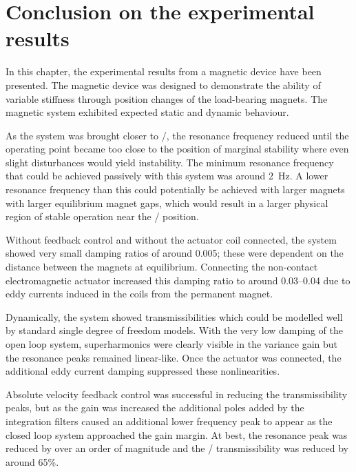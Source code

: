\documentclass[11pt,a4paper]{memoir}
\begin{document}
\section{Conclusion on the experimental results}

In this chapter, the experimental results from a magnetic device have been presented.
The magnetic device was designed to demonstrate the ability of variable stiffness through position changes of the load-bearing magnets.
The magnetic system exhibited expected static and dynamic behaviour.

As the system was brought closer to \qzs/, the resonance frequency reduced until the operating point became too close to the position of marginal stability where even slight disturbances would yield instability.
The minimum resonance frequency that could be achieved passively with this system was around \SI{2}{Hz}.
A lower resonance frequency than this could potentially be achieved with larger magnets with larger equilibrium magnet gaps, which would result in a larger physical region of stable operation near the \qzs/ position.

Without feedback control and without the actuator coil connected, the system showed very small damping ratios of around \num{0.005}; these were dependent on the distance between the magnets at equilibrium.
Connecting the non-contact electromagnetic actuator increased this damping ratio to around \num{0.03}--\num{0.04} due to eddy currents induced in the coils from the permanent magnet.

Dynamically, the system showed transmissibilities which could be modelled well by standard single degree of freedom models.
With the very low damping of the open loop system, superharmonics were clearly visible in the variance gain but the resonance peaks remained linear-like.
Once the actuator was connected, the additional eddy current damping suppressed these nonlinearities.

Absolute velocity feedback control was successful in reducing the transmissibility peaks, but as the gain was increased the additional poles added by the integration filters caused an additional lower frequency peak to appear as the closed loop system approached the gain margin.
At best, the resonance peak was reduced by over an order of magnitude and the \RMS/ transmissibility was reduced by around 65\%.
\end{document}
